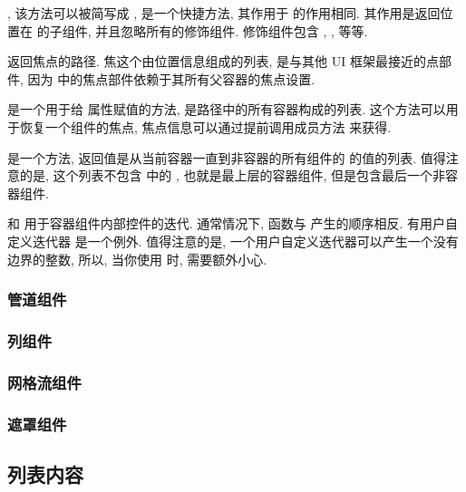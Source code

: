 \indent{}, 该方法可以被简写成 , 是一个快捷方法, 其作用于  的作用相同. 其作用是返回位置在  的子组件, 并且忽略所有的修饰组件. 修饰组件包含 , ,  等等.

\indent{} 返回焦点的路径. 焦这个由位置信息组成的列表, 是与其他 UI 框架最接近的点部件, 因为 \urwid{} 中的焦点部件依赖于其所有父容器的焦点设置.

\indent{} 是一个用于给  属性赋值的方法,  是路径中的所有容器构成的列表. 这个方法可以用于恢复一个组件的焦点, 焦点信息可以通过提前调用成员方法  来获得.

\indent{} 是一个方法, 返回值是从当前容器一直到非容器的所有组件的  的值的列表. 值得注意的是, 这个列表不包含  中的 , 也就是最上层的容器组件, 但是包含最后一个非容器组件.

\indent{} 和  用于容器组件内部控件的迭代. 通常情况下,  函数与  产生的顺序相反. 有用户自定义迭代器  是一个例外. 值得注意的是, 一个用户自定义迭代器可以产生一个没有边界的整数, 所以, 当你使用  时, 需要额外小心.

\subsubsection{管道组件}

\subsubsection{列组件}

\subsubsection{网格流组件}

\subsubsection{遮罩组件}

\subsection{列表内容}